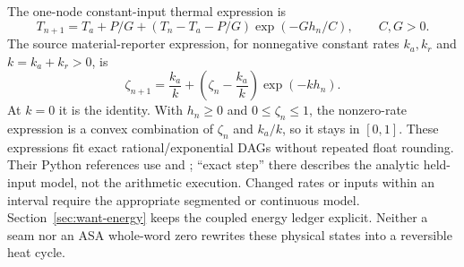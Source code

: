 The one-node constant-input thermal expression is
\begin{equation}
 T_{n+1}=T_a+P/G+(T_n-T_a-P/G)\exp(-Gh_n/C),\qquad C,G>0.
\end{equation}
The source material-reporter expression, for nonnegative constant rates
$k_a,k_r$ and $k=k_a+k_r>0$, is
\begin{equation}
 \zeta_{n+1}=\frac{k_a}{k}
      +\left(\zeta_n-\frac{k_a}{k}\right)\exp(-kh_n).
\end{equation}
At $k=0$ it is the identity. With $h_n\ge0$ and $0\le\zeta_n\le1$, the
nonzero-rate expression is a convex combination of $\zeta_n$ and $k_a/k$,
so it stays in $[0,1]$. These expressions fit exact rational/exponential DAGs
without repeated float rounding. Their Python references use  and
; ``exact step'' there describes the analytic held-input model,
not the arithmetic execution. Changed rates or inputs within an interval require
the appropriate segmented or continuous model. Section~\ref{sec:want-energy}
keeps the coupled energy ledger explicit. Neither a seam nor an ASA
whole-word zero rewrites these physical states into a reversible heat cycle.
